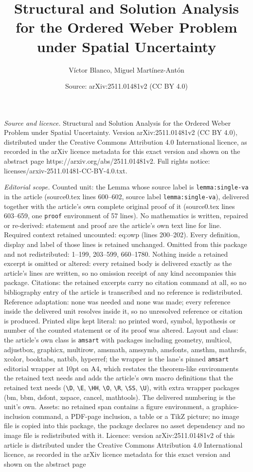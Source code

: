 \documentclass[10pt,a4paper]{amsart}
\title[Structural and Solution Analysis for the Ordered Weber Probl]{Structural and Solution Analysis for the Ordered Weber Problem under Spatial Uncertainty}
\author{V\'ictor Blanco, Miguel Mart\'inez-Ant\'on}
\date{Source: arXiv:2511.01481v2 (CC BY 4.0)}
\begin{document}
\maketitle

\noindent\emph{Source and licence.} Structural and Solution Analysis for the Ordered Weber Problem under Spatial Uncertainty. Version arXiv:2511.01481v2 (CC BY 4.0), distributed under the Creative Commons Attribution 4.0 International licence, as recorded in the arXiv licence metadata for this exact version and shown on the abstract page https://arxiv.org/abs/2511.01481v2. Full rights notice: licenses/arxiv-2511.01481-CC-BY-4.0.txt.\par\smallskip

\noindent\textit{Editorial scope.} Counted unit: the Lemma whose source label is \texttt{lemma:single-va} in the article (source0.tex lines 600--602, source label \texttt{lemma:single-va}), delivered together with the article's own complete original proof of it (source0.tex lines 603--659, one \texttt{proof} environment of 57 lines). No mathematics is written, repaired or re-derived: statement and proof are the article's own text line for line. Required context retained uncounted: eq:owp (lines 200--202). Every definition, display and label of those lines is retained unchanged. Omitted from this package and not redistributed: 1--199, 203--599, 660--1780. Nothing inside a retained excerpt is omitted or altered: every retained body is delivered exactly as the article's lines are written, so no omission receipt of any kind accompanies this package. Citations: the retained excerpts carry no citation command at all, so no bibliography entry of the article is transcribed and no reference is redistributed. Reference adaptation: none was needed and none was made; every reference inside the delivered unit resolves inside it, so no unresolved reference or citation is produced. Printed slips kept literal: no printed word, symbol, hypothesis or number of the counted statement or of its proof was altered. Layout and class: the article's own class is \texttt{amsart} with packages including geometry, multicol, adjustbox, graphicx, multirow, amsmath, amssymb, amsfonts, amsthm, mathrsfs, xcolor, booktabs, natbib, hyperref; the wrapper is the lane's pinned \texttt{amsart} editorial wrapper at 10pt on A4, which restates the theorem-like environments the retained text needs and adds the article's own macro definitions that the retained text needs (\texttt{\textbackslash D}, \texttt{\textbackslash E}, \texttt{\textbackslash HH}, \texttt{\textbackslash O}, \texttt{\textbackslash R}, \texttt{\textbackslash SS}, \texttt{\textbackslash U}), with extra wrapper packages (bm, bbm, dsfont, xspace, cancel, mathtools). The delivered numbering is the unit's own. Assets: no retained span contains a figure environment, a graphics-inclusion command, a PDF-page inclusion, a table or a TikZ picture; no image file is copied into this package, the package declares no asset dependency and no image file is redistributed with it. Licence: version arXiv:2511.01481v2 of this article is distributed under the Creative Commons Attribution 4.0 International licence, as recorded in the arXiv licence metadata for this exact version and shown on the abstract page 
\end{document}
